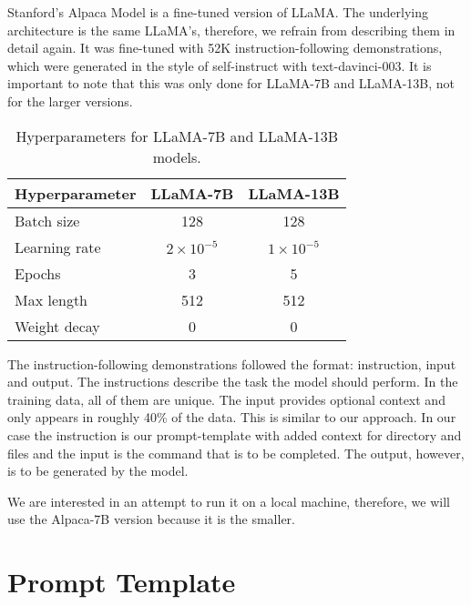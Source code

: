 Stanford's Alpaca Model is a fine-tuned version of LLaMA. The underlying architecture is the same LLaMA's, therefore, we refrain from describing them in detail again. It was fine-tuned with 52K instruction-following demonstrations, which were generated in the style of self-instruct \cite{wang2023selfinstruct} with text-davinci-003. It is important to note that this was only done for LLaMA-7B and LLaMA-13B, not for the larger versions.




\begin{table}[ht]
\centering
\begin{tabular}{|l|c|c|}
\hline
\textbf{Hyperparameter} & \textbf{LLaMA-7B} & \textbf{LLaMA-13B} \\
\hline
Batch size & 128 & 128 \\
Learning rate & $2 \times 10^{-5}$ & $1 \times 10^{-5}$ \\
Epochs & 3 & 5 \\
Max length & 512 & 512 \\
Weight decay & 0 & 0 \\
\hline
\end{tabular}
\caption{Hyperparameters for LLaMA-7B and LLaMA-13B models.\cite{alpaca}}
\label{tab:hyperparameters}
\end{table}




The instruction-following demonstrations followed the format: instruction, input and output\cite{wang2023selfinstruct}. The instructions describe the task the model should perform. In the training data, all of them are unique. The input provides optional context and only appears in roughly 40\% of the data.
This is similar to our approach. In our case the instruction is our prompt-template with added context for directory and files and the input is the command that is to be completed. The output, however, is to be generated by the model.


We are interested in an attempt to run it on a local machine, therefore, 
we will use the Alpaca-7B version because it is the smaller. 



\pagebreak


\pagebreak








\section{Prompt Template}



